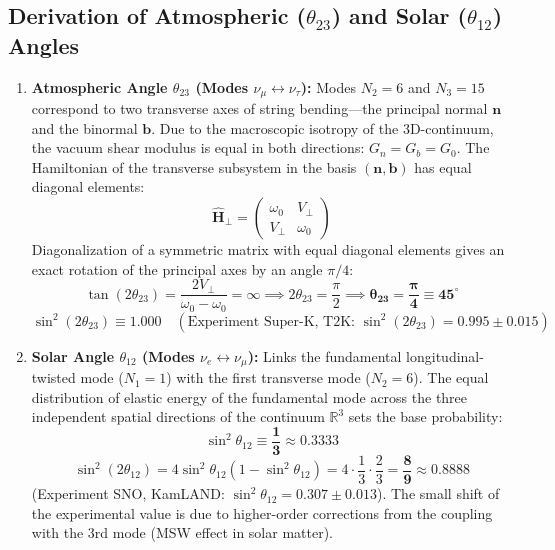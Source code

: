 \documentclass[12pt,a4paper]{article}
\begin{document}
		\subsection{Derivation of Atmospheric ($\theta_{23}$) and Solar ($\theta_{12}$) Angles}
		\begin{enumerate}
			\item \textbf{Atmospheric Angle $\theta_{23}$ (Modes $\nu_\mu \leftrightarrow \nu_\tau$):}
			Modes $N_2=6$ and $N_3=15$ correspond to two transverse axes of string bending—the principal normal $\mathbf{n}$ and the binormal $\mathbf{b}$. Due to the macroscopic isotropy of the 3D-continuum, the vacuum shear modulus is equal in both directions: $G_n = G_b = G_0$. 
			The Hamiltonian of the transverse subsystem in the basis $(\mathbf{n}, \mathbf{b})$ has equal diagonal elements:
			\begin{equation}
				\hat{\mathbf{H}}_{\perp} = \begin{pmatrix} \omega_0 & V_{\perp} \\ V_{\perp} & \omega_0 \end{pmatrix}
			\end{equation}
			Diagonalization of a symmetric matrix with equal diagonal elements gives an exact rotation of the principal axes by an angle $\pi/4$:
			\begin{equation}
				\tan(2\theta_{23}) = \frac{2 V_{\perp}}{\omega_0 - \omega_0} = \infty \implies 2\theta_{23} = \frac{\pi}{2} \implies \mathbf{\theta_{23} = \frac{\pi}{4} \equiv 45^{\circ}}
			\end{equation}
			\begin{equation}
				\sin^2(2\theta_{23}) \equiv \mathbf{1.000} \quad (\text{Experiment Super-K, T2K: } \sin^2(2\theta_{23}) = 0.995 \pm 0.015)
			\end{equation}
			
			\item \textbf{Solar Angle $\theta_{12}$ (Modes $\nu_e \leftrightarrow \nu_\mu$):}
			Links the fundamental longitudinal-twisted mode ($N_1=1$) with the first transverse mode ($N_2=6$). The equal distribution of elastic energy of the fundamental mode across the three independent spatial directions of the continuum $\mathbb{R}^3$ sets the base probability:
			\begin{equation}
				\sin^2\theta_{12} \equiv \mathbf{\frac{1}{3}} \approx 0.3333
			\end{equation}
			\begin{equation}
				\sin^2(2\theta_{12}) = 4 \sin^2\theta_{12} (1 - \sin^2\theta_{12}) = 4 \cdot \frac{1}{3} \cdot \frac{2}{3} = \mathbf{\frac{8}{9}} \approx \mathbf{0.8888}
			\end{equation}
			(Experiment SNO, KamLAND: $\sin^2\theta_{12} = 0.307 \pm 0.013$). The small shift of the experimental value is due to higher-order corrections from the coupling with the 3rd mode (MSW effect in solar matter).
		\end{enumerate}
		
\end{document}
